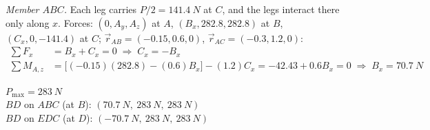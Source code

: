 \documentclass[11pt]{article}
\begin{document}
\textit{Member $ABC$.} Each leg carries $P/2 = \SI{141.4}{N}$ at $C$, and the legs interact there only along $x$. Forces: $(0, A_y, A_z)$ at $A$, $(B_x, 282.8, 282.8)$ at $B$, $(C_x, 0, -141.4)$ at $C$; $\vec r_{AB} = (-0.15, 0.6, 0)$, $\vec r_{AC} = (-0.3, 1.2, 0)$:
\begin{align*}
\textstyle\sum F_x &= B_x + C_x = 0 \;\Rightarrow\; C_x = -B_x\\
\textstyle\sum M_{A,z} &= \big[(-0.15)(282.8) - (0.6)B_x\big] - (1.2)C_x = -42.43 + 0.6B_x = 0 \;\Rightarrow\; B_x = \SI{70.7}{N}
\end{align*}

\begin{finalanswer}
$P_{\max} = \SI{283}{N}$\\[2pt]
$BD$ on $ABC$ (at $B$): $(\SI{70.7}{N},\ \SI{283}{N},\ \SI{283}{N})$\\[2pt]
$BD$ on $EDC$ (at $D$): $(\SI{-70.7}{N},\ \SI{283}{N},\ \SI{283}{N})$
\end{finalanswer}
\end{document}
